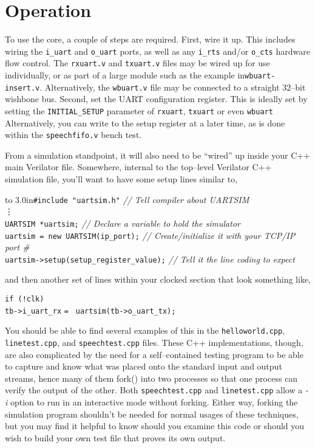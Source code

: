 \documentclass{gqtekspec}
\begin{document}
\chapter{Operation}\label{ch:ops}

%

To use the core, a couple of steps are required.  First, wire it up.  This
includes wiring the {\tt i\_uart} and {\tt o\_uart} ports, as well as any
{\tt i\_rts} and/or {\tt o\_cts} hardware flow control.  The
{\tt rxuart.v} and {\tt txuart.v} files may be wired up for use individually,
or as part of a large module such as the example in{\tt wbuart-insert.v}. 
Alternatively, the {\tt wbuart.v} file may be connected to a straight 32--bit
wishbone bus.
Second, set the UART configuration register.  This is ideally set by setting
the {\tt INITIAL\_SETUP} parameter of {\tt rxuart}, {\tt txuart} or even
{\tt wbuart}  Alternatively, you can write to the setup register at a later
time, as is done within the {\tt speechfifo.v} bench test.

From a simulation standpoint, it will also need to be ``wired'' up inside your
C++ main Verilator file.  Somewhere, internal to the top--level Verilator
C++ simulation file, you'll want to have some setup lines similar to,
\begin{tabbing}
\hbox to 3.0in{\tt \#include "uartsim.h"} \= {\em // Tell compiler about UARTSIM}\\
\vdots \\
{\tt UARTSIM *uartsim;} \> {\em // Declare a variable to hold the simulator}\\
{\tt uartsim = new UARTSIM(ip\_port);} \> {\em // Create/initialize it with your TCP/IP port \#} \\
{\tt uartsim->setup(setup\_register\_value);} \> {\em // Tell it the line coding to expect}\\
\end{tabbing}
and then another set of lines within your clocked section that look something
like,
\begin{tabbing}
{\tt if (!clk)} \= \\
\> {\tt tb->i\_uart\_rx} {\tt = } {\tt uartsim(tb->o\_uart\_tx);}
\end{tabbing}
You should be able to find several examples of this in the {\tt helloworld.cpp},
{\tt linetest.cpp}, and {\tt speechtest.cpp} files.  These C++ implementations,
though, are also complicated by the need for a self--contained testing program
to be able to capture and know what was placed onto the standard input and
output streams, hence many of them fork() into two processes so that one
process can verify the output of the other.  Both {\tt speechtest.cpp} and
{\tt linetest.cpp} allow a {\em -i} option to run in an interactive mode without
forking.  Either way, forking the simulation program shouldn't be needed for
normal usages of these techniques, but you may find it helpful to know should
you examine this code or should you wish to build your own test file that
proves its own output.
\end{document}
